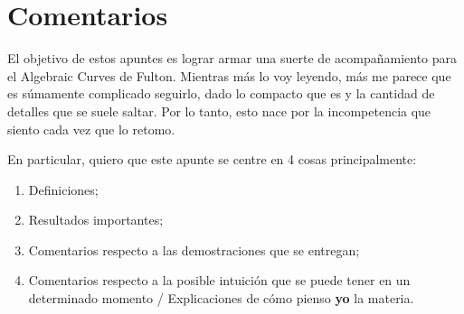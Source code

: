 \section{Comentarios}
El objetivo de estos apuntes es lograr armar una suerte de acompañamiento para el Algebraic Curves de Fulton. Mientras más lo voy leyendo, más me parece que es súmamente complicado seguirlo, dado lo compacto que es y la cantidad de detalles que se suele saltar. Por lo tanto, esto nace por la incompetencia que siento cada vez que lo retomo. \par
En particular, quiero que este apunte se centre en 4 cosas principalmente:
\begin{enumerate}
	\item Definiciones;

	\item Resultados importantes;

	\item Comentarios respecto a las demostraciones que se entregan;

	\item Comentarios respecto a la posible intuición que se puede tener en un determinado momento / Explicaciones de cómo pienso \textbf{yo} la materia.
\end{enumerate}
